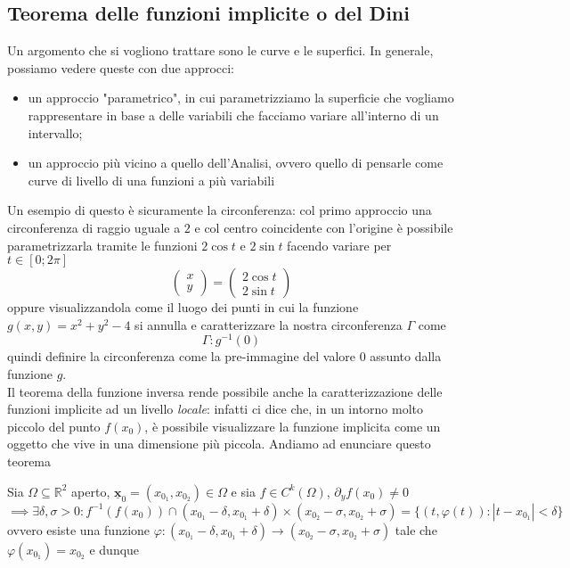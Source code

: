 \begin{theorem}
\section{Teorema delle funzioni implicite o del Dini}
Un argomento che si vogliono trattare sono le curve e le superfici. In generale, possiamo vedere queste con due approcci:
\begin{itemize}
	\item un approccio "parametrico", in cui parametrizziamo la superficie che vogliamo rappresentare in base a delle variabili che facciamo variare all'interno di un intervallo;
	\item un approccio più vicino a quello dell'Analisi, ovvero quello di pensarle come curve di livello di una funzioni a più variabili
\end{itemize}
Un esempio di questo è sicuramente la circonferenza: col primo approccio una circonferenza di raggio uguale a $2$ e col centro coincidente con l'origine è possibile parametrizzarla tramite le funzioni $2\cos{t}$ e $2\sin{t}$ facendo variare per $t \in [0; 2\pi]$
$$
\begin{pmatrix}
	x \\
	y
\end{pmatrix} = \begin{pmatrix}
	2\cos{t} \\
	2\sin{t}
\end{pmatrix}
$$
oppure visualizzandola come il luogo dei punti in cui la funzione $g(x, y) = x^2 + y^2 - 4$ si annulla e caratterizzare la nostra circonferenza $\Gamma$ come
$$
\Gamma : g^{-1}(0)
$$
quindi definire la circonferenza come la pre-immagine del valore $0$ assunto dalla funzione $g$. \\
Il teorema della funzione inversa rende possibile anche la caratterizzazione delle funzioni implicite ad un livello \emph{locale}: infatti ci dice che, in un intorno molto piccolo del punto $f(x_0)$, è possibile visualizzare la funzione implicita come un oggetto che vive in una dimensione più piccola. Andiamo ad enunciare questo teorema
\begin{theorem}
Sia $\Omega \subseteq \mathbb{R}^2$ aperto, $\bm{\underline{x}}_0 = (x_{0_1}, x_{0_2}) \in \Omega$ e sia $f \in C^k (\Omega)$, $\partial_y f(x_0) \neq 0$
$$\implies \exists \delta, \sigma > 0 : f^{-1}(f(x_0)) \cap (x_{0_1}-\delta, x_{0_1}+\delta) \times (x_{0_2} - \sigma, x_{0_2}+\sigma) = \{(t, \varphi(t)) : |t-x_{0_1}| < \delta \}$$
ovvero esiste una funzione $\varphi: (x_{0_1} - \delta, x_{0_1} + \delta) \to (x_{0_2}-\sigma, x_{0_2} + \sigma)$ tale che $\varphi(x_{0_1}) = x_{0_2}$ e dunque

\end{theorem}
\end{theorem}
